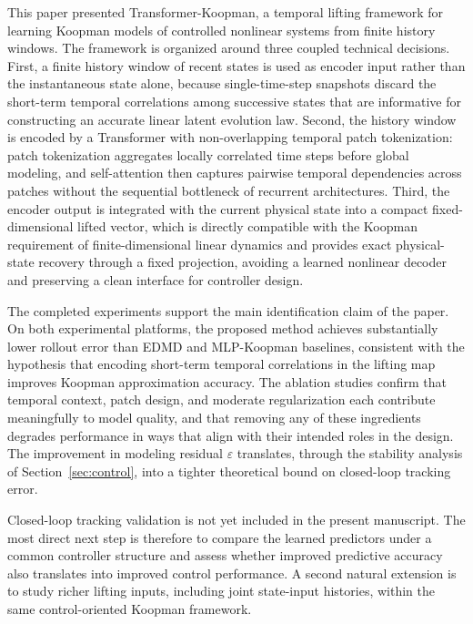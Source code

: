 \documentclass[journal]{IEEEtran}
\begin{document}
This paper presented Transformer-Koopman, a temporal lifting framework for learning Koopman models of controlled nonlinear systems from finite history windows. The framework is organized around three coupled technical decisions. First, a finite history window of recent states is used as encoder input rather than the instantaneous state alone, because single-time-step snapshots discard the short-term temporal correlations among successive states that are informative for constructing an accurate linear latent evolution law. Second, the history window is encoded by a Transformer with non-overlapping temporal patch tokenization: patch tokenization aggregates locally correlated time steps before global modeling, and self-attention then captures pairwise temporal dependencies across patches without the sequential bottleneck of recurrent architectures. Third, the encoder output is integrated with the current physical state into a compact fixed-dimensional lifted vector, which is directly compatible with the Koopman requirement of finite-dimensional linear dynamics and provides exact physical-state recovery through a fixed projection, avoiding a learned nonlinear decoder and preserving a clean interface for controller design.

The completed experiments support the main identification claim of the paper. On both experimental platforms, the proposed method achieves substantially lower rollout error than EDMD and MLP-Koopman baselines, consistent with the hypothesis that encoding short-term temporal correlations in the lifting map improves Koopman approximation accuracy. The ablation studies confirm that temporal context, patch design, and moderate regularization each contribute meaningfully to model quality, and that removing any of these ingredients degrades performance in ways that align with their intended roles in the design. The improvement in modeling residual $\varepsilon$ translates, through the stability analysis of Section~\ref{sec:control}, into a tighter theoretical bound on closed-loop tracking error.

Closed-loop tracking validation is not yet included in the present manuscript. The most direct next step is therefore to compare the learned predictors under a common controller structure and assess whether improved predictive accuracy also translates into improved control performance. A second natural extension is to study richer lifting inputs, including joint state-input histories, within the same control-oriented Koopman framework.
\end{document}
